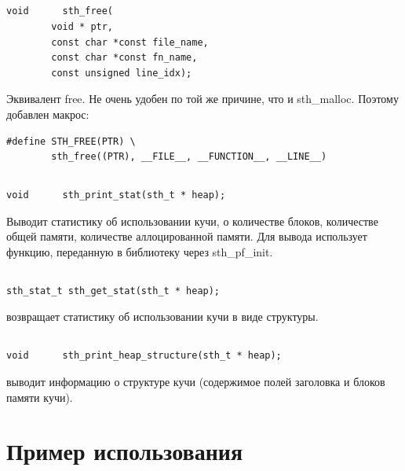 \documentclass{article}
\begin{document}
\subsection*{}
\begin{lstlisting}
void      sth_free(
        void * ptr, 
        const char *const file_name, 
        const char *const fn_name, 
        const unsigned line_idx);
\end{lstlisting}
Эквивалент free. Не очень удобен по той же причине, что и sth\_malloc. Поэтому добавлен макрос:
\begin{lstlisting}
#define STH_FREE(PTR) \
        sth_free((PTR), __FILE__, __FUNCTION__, __LINE__)
\end{lstlisting}


\subsection*{}
\begin{lstlisting}
void      sth_print_stat(sth_t * heap);
\end{lstlisting}
Выводит статистику об использовании кучи, о количестве блоков, количестве общей памяти, количестве аллоцированной памяти. Для вывода использует функцию, переданную в библиотеку через sth\_pf\_init.

\subsection*{}
\begin{lstlisting}
sth_stat_t sth_get_stat(sth_t * heap);
\end{lstlisting}
возвращает статистику об использовании кучи в виде структуры.

\subsection*{}
\begin{lstlisting}
void      sth_print_heap_structure(sth_t * heap);
\end{lstlisting}
выводит информацию о структуре кучи (содержимое полей заголовка и блоков памяти кучи).

\newpage
\section{Пример использования}
\end{document}
